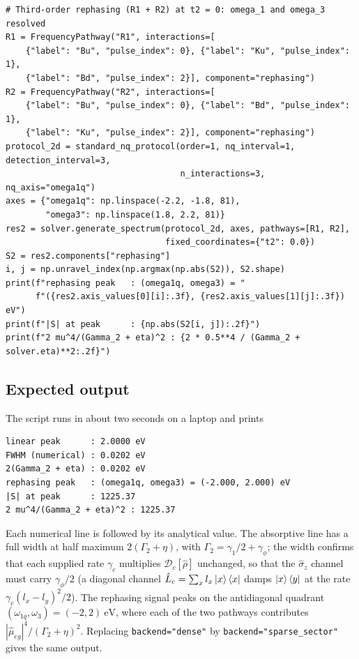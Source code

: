 \documentclass[11pt]{article}
\begin{document}
\begin{verbatim}
# Third-order rephasing (R1 + R2) at t2 = 0: omega_1 and omega_3 resolved
R1 = FrequencyPathway("R1", interactions=[
    {"label": "Bu", "pulse_index": 0}, {"label": "Ku", "pulse_index": 1},
    {"label": "Bd", "pulse_index": 2}], component="rephasing")
R2 = FrequencyPathway("R2", interactions=[
    {"label": "Bu", "pulse_index": 0}, {"label": "Bd", "pulse_index": 1},
    {"label": "Ku", "pulse_index": 2}], component="rephasing")
protocol_2d = standard_nq_protocol(order=1, nq_interval=1, detection_interval=3,
                                   n_interactions=3, nq_axis="omega1q")
axes = {"omega1q": np.linspace(-2.2, -1.8, 81),
        "omega3": np.linspace(1.8, 2.2, 81)}
res2 = solver.generate_spectrum(protocol_2d, axes, pathways=[R1, R2],
                                fixed_coordinates={"t2": 0.0})
S2 = res2.components["rephasing"]
i, j = np.unravel_index(np.argmax(np.abs(S2)), S2.shape)
print(f"rephasing peak   : (omega1q, omega3) = "
      f"({res2.axis_values[0][i]:.3f}, {res2.axis_values[1][j]:.3f}) eV")
print(f"|S| at peak      : {np.abs(S2[i, j]):.2f}")
print(f"2 mu^4/(Gamma_2 + eta)^2 : {2 * 0.5**4 / (Gamma_2 + solver.eta)**2:.2f}")
\end{verbatim}

\subsection{Expected output}
The script runs in about two seconds on a laptop and prints
\begin{verbatim}
linear peak      : 2.0000 eV
FWHM (numerical) : 0.0202 eV
2(Gamma_2 + eta) : 0.0202 eV
rephasing peak   : (omega1q, omega3) = (-2.000, 2.000) eV
|S| at peak      : 1225.37
2 mu^4/(Gamma_2 + eta)^2 : 1225.37
\end{verbatim}
Each numerical line is followed by its analytical value. The absorptive line has a full width at half maximum $2(\Gamma_2+\eta)$, with $\Gamma_2=\gamma_1/2+\gamma_\phi$; the width confirms that each supplied rate $\gamma_c$ multiplies $\mathcal{D}_c[\hat\rho]$ unchanged, so that the $\hat\sigma_z$ channel must carry $\gamma_\phi/2$ (a diagonal channel $\hat L_c=\sum_x l_x\ket{x}\bra{x}$ damps $\ket{x}\bra{y}$ at the rate $\gamma_c(l_x-l_y)^2/2$). The rephasing signal peaks on the antidiagonal quadrant $(\omega_{1q},\omega_3)=(-2,2)~\mathrm{eV}$, where each of the two pathways contributes $|\hat\mu_{eg}|^4/(\Gamma_2+\eta)^2$. Replacing \texttt{backend="dense"} by \texttt{backend="sparse\_sector"} gives the same output.
\end{document}
